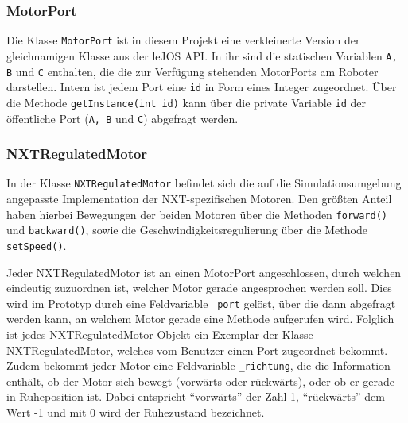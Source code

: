 \documentclass[paper=a4, DIV=calc, BCOR=12mm, twoside=on, onecolumn=on, open = right, titlepage =on, parskip =half-, headsepline = on, footsepline = off, chapterprefix = off, appendixprefix = on, fontsize = 12pt, numbers = noenddot, abstract = on]{scrbook}
\begin{document}
\subsubsection{MotorPort}
Die Klasse \texttt{MotorPort} ist in diesem Projekt eine verkleinerte Version der gleichnamigen Klasse aus der leJOS API. In ihr sind die statischen Variablen \texttt{A, B} und \texttt{C} enthalten, die die zur Verfügung stehenden MotorPorts am Roboter darstellen. Intern ist jedem Port eine \texttt{id} in Form eines Integer zugeordnet. Über die Methode \texttt{get\-In\-stance(int id)} kann über die private Variable \texttt{id} der öffentliche Port (\texttt{A, B} und \texttt{C}) abgefragt werden.

\subsubsection{NXTRegulatedMotor}
In der Klasse \texttt{NXTRegulatedMotor} befindet sich die auf die Simulationsumgebung angepasste Implementation der NXT-spezifischen Motoren. Den größten Anteil haben hierbei Bewegungen der beiden Motoren über die Methoden \texttt{for\-ward()} und \texttt{back\-ward()}, sowie die Geschwindigkeitsregulierung über die Methode \texttt{set\-Speed()}. 

Jeder NXTRegulatedMotor ist an einen MotorPort angeschlossen, durch welchen eindeutig zuzuordnen ist, welcher Motor gerade angesprochen werden soll. Dies wird im Prototyp durch eine Feldvariable \texttt{{\_}port} gelöst, über die dann abgefragt werden kann, an welchem Motor gerade eine Methode aufgerufen wird. Folglich ist jedes NXT\-Regulated\-Motor\--Objekt ein Exemplar der Klasse NXTRegulatedMotor, welches vom Benutzer einen Port zugeordnet bekommt.\\
Zudem bekommt jeder Motor eine Feldvariable \texttt{{\_}richtung}, die die Information enthält, ob der Motor sich bewegt (vorwärts oder rückwärts), oder ob er gerade in Ruheposition ist. Dabei entspricht "`vorwärts"' der Zahl 1, "`rückwärts"' dem Wert -1 und mit 0 wird der Ruhezustand bezeichnet.
\end{document}
